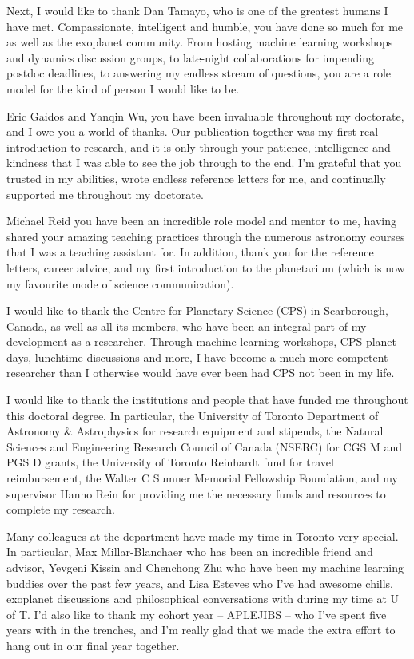 \documentclass[letterpaper]{ut-thesis} %
\begin{document}
\begin{preliminary}
\begin{acknowledgements}
Next, I would like to thank Dan Tamayo, who is one of the greatest humans I have met. 
Compassionate, intelligent and humble, you have done so much for me as well as the exoplanet community. 
From hosting machine learning workshops and dynamics discussion groups, to late-night collaborations for impending postdoc deadlines, to answering my endless stream of questions, you are a role model for the kind of person I would like to be. 

Eric Gaidos and Yanqin Wu, you have been invaluable throughout my doctorate, and I owe you a world of thanks. 
Our publication together was my first real introduction to research, and it is only through your patience, intelligence and kindness that I was able to see the job through to the end. 
I'm grateful that you trusted in my abilities, wrote endless reference letters for me, and continually supported me throughout my doctorate.

Michael Reid you have been an incredible role model and mentor to me, having shared your amazing teaching practices through the numerous astronomy courses that I was a teaching assistant for. 
In addition, thank you for the reference letters, career advice, and my first introduction to the planetarium (which is now my favourite mode of science communication).

I would like to thank the Centre for Planetary Science (CPS) in Scarborough, Canada, as well as all its members, who have been an integral part of my development as a researcher. 
Through machine learning workshops, CPS planet days, lunchtime discussions and more, I have become a much more competent researcher than I otherwise would have ever been had CPS not been in my life. 

I would like to thank the institutions and people that have funded me throughout this doctoral degree. 
In particular, the University of Toronto Department of Astronomy \& Astrophysics for research equipment and stipends, the Natural Sciences and Engineering Research Council of Canada (NSERC) for CGS M and PGS D grants, the University of Toronto Reinhardt fund for travel reimbursement, the Walter C Sumner Memorial Fellowship Foundation, and my supervisor Hanno Rein for providing me the necessary funds and resources to complete my research. 

Many colleagues at the department have made my time in Toronto very special. 
In particular, Max Millar-Blanchaer who has been an incredible friend and advisor, Yevgeni Kissin and Chenchong Zhu who have been my machine learning buddies over the past few years, and Lisa Esteves who I've had awesome chills, exoplanet discussions and philosophical conversations with during my time at U of T.
I'd also like to thank my cohort year -- APLEJIBS -- who I've spent five years with in the trenches, and I'm really glad that we made the extra effort to hang out in our final year together. 


\end{acknowledgements}
\end{preliminary}
\end{document}
